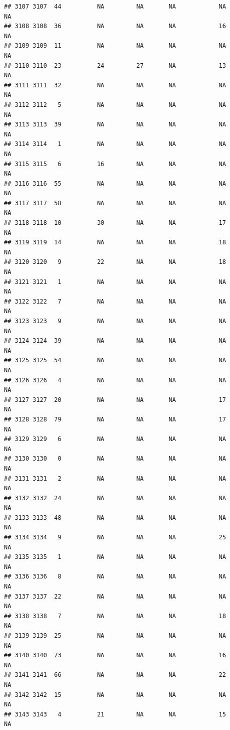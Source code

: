 \documentclass[man]{apa6}
\begin{document}
\begin{verbatim}
## 3107 3107  44          NA         NA       NA            NA       NA
## 3108 3108  36          NA         NA       NA            16       NA
## 3109 3109  11          NA         NA       NA            NA       NA
## 3110 3110  23          24         27       NA            13       NA
## 3111 3111  32          NA         NA       NA            NA       NA
## 3112 3112   5          NA         NA       NA            NA       NA
## 3113 3113  39          NA         NA       NA            NA       NA
## 3114 3114   1          NA         NA       NA            NA       NA
## 3115 3115   6          16         NA       NA            NA       NA
## 3116 3116  55          NA         NA       NA            NA       NA
## 3117 3117  58          NA         NA       NA            NA       NA
## 3118 3118  10          30         NA       NA            17       NA
## 3119 3119  14          NA         NA       NA            18       NA
## 3120 3120   9          22         NA       NA            18       NA
## 3121 3121   1          NA         NA       NA            NA       NA
## 3122 3122   7          NA         NA       NA            NA       NA
## 3123 3123   9          NA         NA       NA            NA       NA
## 3124 3124  39          NA         NA       NA            NA       NA
## 3125 3125  54          NA         NA       NA            NA       NA
## 3126 3126   4          NA         NA       NA            NA       NA
## 3127 3127  20          NA         NA       NA            17       NA
## 3128 3128  79          NA         NA       NA            17       NA
## 3129 3129   6          NA         NA       NA            NA       NA
## 3130 3130   0          NA         NA       NA            NA       NA
## 3131 3131   2          NA         NA       NA            NA       NA
## 3132 3132  24          NA         NA       NA            NA       NA
## 3133 3133  48          NA         NA       NA            NA       NA
## 3134 3134   9          NA         NA       NA            25       NA
## 3135 3135   1          NA         NA       NA            NA       NA
## 3136 3136   8          NA         NA       NA            NA       NA
## 3137 3137  22          NA         NA       NA            NA       NA
## 3138 3138   7          NA         NA       NA            18       NA
## 3139 3139  25          NA         NA       NA            NA       NA
## 3140 3140  73          NA         NA       NA            16       NA
## 3141 3141  66          NA         NA       NA            22       NA
## 3142 3142  15          NA         NA       NA            NA       NA
## 3143 3143   4          21         NA       NA            15       NA

\end{verbatim}
\end{document}
